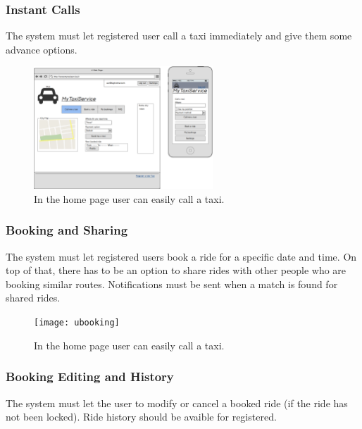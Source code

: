 		\subsubsection {Instant Calls}
			The system must let registered user call a taxi immediately and give them some advance options.
			\begin{figure}[h!]
				\includegraphics[width=0.6\textwidth]{homelog}
				\caption{In the home page user can easily call a taxi.}
			\end{figure}
			\newpage
		\subsubsection {Booking and Sharing}
			The system must let registered users book a ride for a specific date and time. On top of that, there has to be an option to share
			rides with other people who are booking similar routes. Notifications must be sent when a match is found for shared rides.
			\begin{figure}[h!]
				\texttt{[image: ubooking]}
				\caption{In the home page user can easily call a taxi.}
			\end{figure}
			\newpage
		\subsubsection {Booking Editing and History}
			The system must let the user to modify or cancel a booked ride (if the ride has not been locked).
			Ride history should be avaible for registered.





